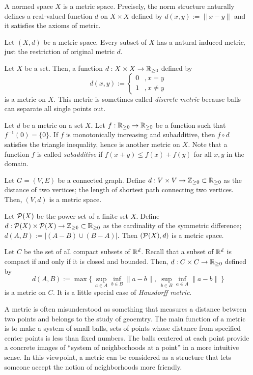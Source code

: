 \documentclass{../note}
\begin{document}
\begin{ex}
\leavevmode
\begin{parts}
\item
A normed space $X$ is a metric space.
Precisely, the norm structure naturally defines a real-valued function $d$ on $X\times X$ defined by $d(x,y):=\|x-y\|$ and it satisfies the axioms of metric.
\item
Let $(X,d)$ be a metric space.
Every subset of $X$ has a natural induced metric, just the restriction of original metric $d$.
\item
Let $X$ be a set.
Then, a function $d:X\times X\to\mathbb{R}_{\ge0}$ defined by
\[d(x,y):=\begin{cases}0&,x=y\\1&,x\ne y\end{cases}\]
is a metric on $X$.
This metric is sometimes called \emph{discrete metric} because balls can separate all single points out.
\item
Let $d$ be a metric on a set $X$.
Let $f:\mathbb{R}_{\ge0}\to\mathbb{R}_{\ge0}$ be a function such that $f^{-1}(0)=\{0\}$.
If $f$ is monotonically increasing and subadditive, then $f\circ d$ satisfies the triangle inequality, hence is another metric on $X$.
Note that a function $f$ is called \emph{subadditive} if $f(x+y)\le f(x)+f(y)$ for all $x,y$ in the domain.
\item
Let $G=(V,E)$ be a connected graph.
Define $d:V\times V\to\mathbb{Z}_{\ge0}\subset\mathbb{R}_{\ge0}$ as the distance of two vertices; the length of shortest path connecting two vertices.
Then, $(V,d)$ is a metric space.
\item
Let $\mathcal{P}(X)$ be the power set of a finite set $X$.
Define $d:\mathcal{P}(X)\times\mathcal{P}(X)\to\mathbb{Z}_{\ge0}\subset\mathbb{R}_{\ge0}$ as the cardinality of the symmetric difference; $d(A,B):=|(A-B)\cup(B-A)|$.
Then $(\mathcal{P}(X),d)$ is a metric space.
\item
Let $C$ be the set of all compact subsets of $\mathbb{R}^d$.
Recall that a subset of $\mathbb{R}^d$ is compact if and only if it is closed and bounded.
Then, $d:C\times C\to\mathbb{R}_{\ge0}$ defined by
\[d(A,B):=\max\{\,\sup_{a\in A}\inf_{b\in B}\|a-b\|,\ \sup_{b\in B}\inf_{a\in A}\|a-b\|\,\}\]
is a metric on $C$.
It is a little special case of \emph{Hausdorff metric}.
\end{parts}
\end{ex}

A metric is often misunderstood as something that measures a distance between two points and belongs to the study of geoemtry.
The main function of a metric is to make a system of small balls, sets of points whose distance from specified center points is less than fixed numbers.
The balls centered at each point provide a concrete images of ``system of neighborhoods at a point'' in a more intuitive sense.
In this viewpoint, a metric can be considered as a structure that lets someone accept the notion of neighborhoods more friendly.
\end{document}
